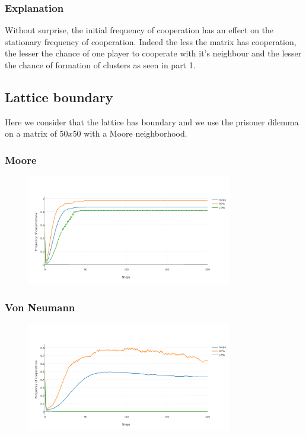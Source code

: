 \documentclass[11pt]{article}
\begin{document}
\subsubsection{Explanation}

Without surprise, the initial frequency of cooperation has an effect on the stationary frequency of cooperation. Indeed the less the matrix has cooperation, the lesser the chance of one player to cooperate with it's neighbour and the lesser the chance of formation of clusters as seen in part 1.


\subsection{Lattice boundary}

Here we consider that the lattice has boundary and we use the prisoner dilemma on a matrix of $50x50$ with a Moore neighborhood.

\subsubsection{Moore}

\begin{figure}[H]
\centering
   \includegraphics[width=0.8\textwidth]{img/part3/moore-bounded.png}
\end{figure}

\subsubsection{Von Neumann}

\begin{figure}[H]
\centering
   \includegraphics[width=0.8\textwidth]{img/part3/von-neuman-bouded.png}
\end{figure}
\end{document}
